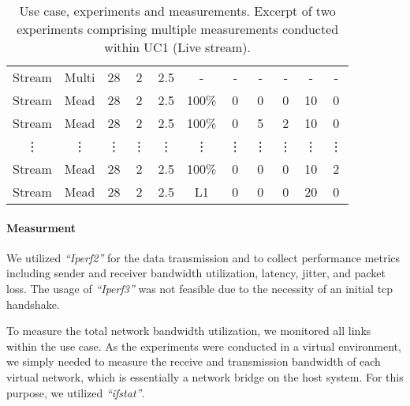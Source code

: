 \begin{table}
\begin{tabular}{@{}ccccccccccc@{}}
Stream   & Multi    & 28        & 2         & 2.5    & -      & -      & -         & -         & -               & -          \\
Stream   & Mead     & 28        & 2         & 2.5    & 100\%  & 0      & 0         & 0         & 10              & 0          \\
Stream   & Mead     & 28        & 2         & 2.5    & 100\%  & 0      & 5         & 2         & 10              & 0          \\
\vdots   & \vdots   & \vdots    & \vdots    & \vdots & \vdots & \vdots & \vdots    & \vdots    & \vdots          & \vdots \\[3pt]
Stream   & Mead     & 28        & 2         & 2.5    & 100\%  & 0      & 0         & 0         & 10              & 2          \\
Stream   & Mead     & 28        & 2         & 2.5    & L1     & 0      & 0         & 0         & 20              & 0          \\
\bottomrule
\end{tabular}
\caption[Use case, experiments and measurements]{
    Use case, experiments and measurements.
    Excerpt of two experiments comprising multiple measurements conducted
    within UC1 (Live stream).
}
\label{tab:usecase_experiment_measurement}
\end{table}

\paragraph{Measurment} %
\label{par:Measurment}

We utilized \textit{``Iperf2''} for the data transmission and to collect
    performance metrics including sender and receiver bandwidth utilization,
    latency, jitter, and packet loss.
The usage of \textit{``Iperf3''} was not feasible due to the necessity of an
    initial \gls{tcp} handshake.

To measure the total network bandwidth utilization, we monitored all links
    within the use case.
As the experiments were conducted in a virtual environment, we simply needed to
    measure the receive and transmission bandwidth of each virtual network,
    which is essentially a network bridge on the host system.
For this purpose, we utilized \textit{``ifstat''}.

